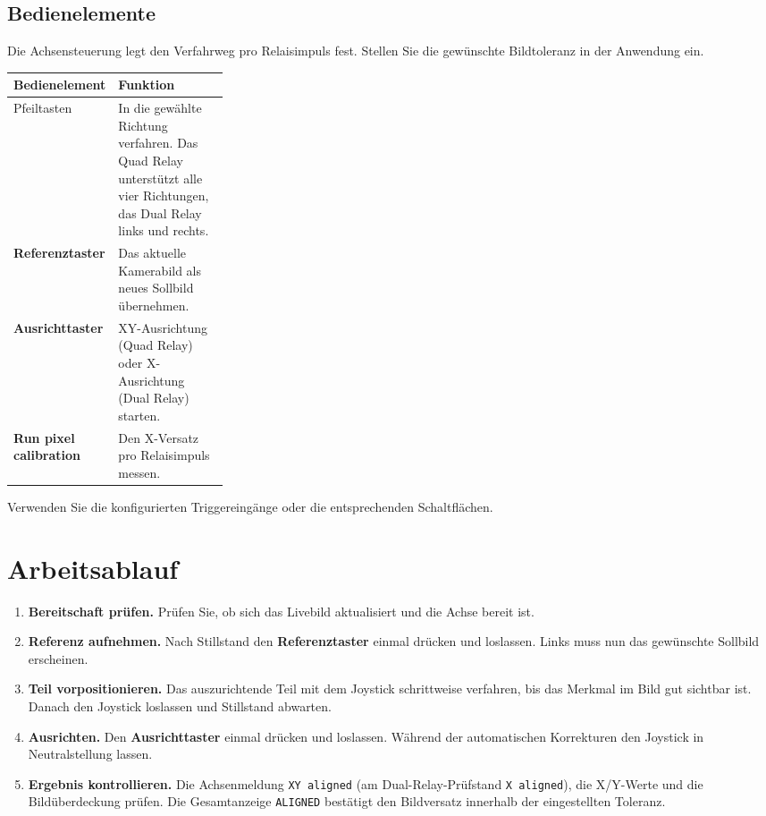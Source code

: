 \documentclass[a4paper,11pt]{article}
\newcommand{\Referenz}{\textbf{Referenztaster}}
\newcommand{\Ausrichten}{\textbf{Ausrichttaster}}
\newcommand{\Status}[1]{\texttt{#1}}
\begin{document}
\subsection{Bedienelemente}

Die Achsensteuerung legt den Verfahrweg pro Relaisimpuls fest. Stellen Sie
die gewünschte Bildtoleranz in der Anwendung ein.

\begin{tabularx}{\linewidth}{@{}L{0.28\linewidth}Y@{}}
\toprule
\textbf{Bedienelement} & \textbf{Funktion} \\
\midrule
Pfeiltasten & In die gewählte Richtung verfahren. Das Quad Relay unterstützt alle vier Richtungen, das Dual Relay links und rechts. \\
\Referenz & Das aktuelle Kamerabild als neues Sollbild übernehmen. \\
\Ausrichten & XY-Ausrichtung (Quad Relay) oder X-Ausrichtung (Dual Relay) starten. \\
\textbf{Run pixel calibration} & Den X-Versatz pro Relaisimpuls messen. \\
\bottomrule
\end{tabularx}

Verwenden Sie die konfigurierten Triggereingänge oder die entsprechenden Schaltflächen.

\newpage
\section{Arbeitsablauf}

\begin{enumerate}
  \setlength{\itemsep}{0.45em}
  \item \textbf{Bereitschaft prüfen.} Prüfen Sie, ob sich das Livebild aktualisiert und die
  Achse bereit ist.

  \item \textbf{Referenz aufnehmen.} Nach Stillstand den \Referenz{} einmal drücken
  und loslassen. Links muss nun das gewünschte Sollbild erscheinen.

  \item \textbf{Teil vorpositionieren.} Das auszurichtende Teil mit dem
  Joystick schrittweise verfahren, bis das Merkmal im Bild gut sichtbar ist.
  Danach den Joystick loslassen und Stillstand abwarten.

  \item \textbf{Ausrichten.} Den \Ausrichten{} einmal drücken und loslassen.
  Während der automatischen Korrekturen den Joystick in Neutralstellung lassen.

  \item \textbf{Ergebnis kontrollieren.} Die Achsenmeldung
  \Status{XY aligned} (am Dual-Relay-Prüfstand \Status{X aligned}), die X/Y-Werte und die Bildüberdeckung prüfen.
  Die Gesamtanzeige \Status{ALIGNED} bestätigt den Bildversatz innerhalb der
  eingestellten Toleranz.
\end{enumerate}
\end{document}
